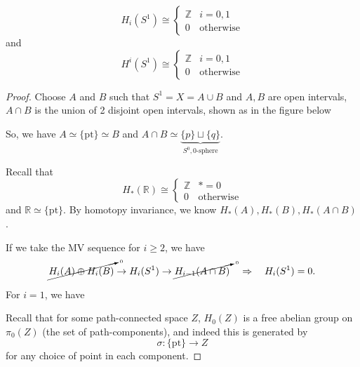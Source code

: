 \documentclass[a4paper,11pt]{article}
\begin{document}
	\begin{prop}
		\[
			H_i (S^1) \cong \begin{cases}
				\mathbb{Z} & i = 0,1\\
				0 & \text{otherwise}
			\end{cases}	
		\]
		and 
		\[
			H^i (S^1) \cong \begin{cases}
				\mathbb{Z} & i = 0,1\\
				0 & \text{otherwise}
			\end{cases}	
		\]
	\end{prop}
	\begin{proof}
		Choose $A$ and $B$ such that $S^1 = X = A \cup B$ and $A,B$ are open intervals, $A \cap B$ is the union of 2 disjoint open intervals, shown as in the figure below
		

		So, we have $A \simeq \{\text{pt}\} \simeq B$ and $A \cap B \simeq \underbrace{\{p\} \sqcup \{q\}}_{S^0, \text{0-sphere}}$. 

		Recall that 
		\[
			H_* (\mathbb{R}) \cong \begin{cases}
				\mathbb{Z} & * = 0\\
				0 & \text{otherwise}
			\end{cases}
		\]
		and $\mathbb{R} \simeq \{\text{pt}\}$. By homotopy invariance, we know $H_*(A), H_*(B), H_*(A \cap B)$.

		If we take the MV sequence for $i \geq 2$, we have
		\[
			\cancelto{\text{\tiny 0}}{H_i (A) \oplus H_i(B)} \to H_i(S^1) \to \cancelto{\text{\tiny 0}}{H_{i-1}(A\cap B)} \quad \Rightarrow \quad H_i(S^1) = 0.
		\]
		
		For $i = 1$, we have
		\begin{center}
		\end{center}

		Recall that for some path-connected space $Z$, $H_0(Z)$ is a free abelian group on $\pi_0 (Z)$ (the set of path-components), and indeed this is generated by
		\[
			\sigma : \{\text{pt}\} \to Z
		\]
		for any choice of point in each component.


\end{proof}
\end{document}
